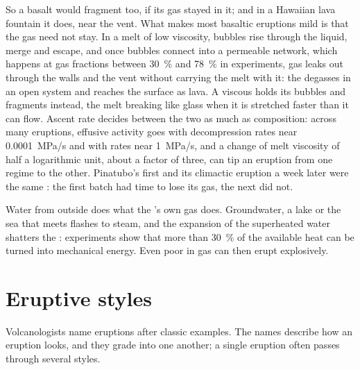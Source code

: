 So a basalt would fragment too, if its gas stayed in it; and in a Hawaiian lava
fountain it does, near the vent. What makes most basaltic eruptions mild is that
the gas need not stay. In a melt of low viscosity, bubbles rise through the
liquid, merge and escape, and once bubbles connect into a permeable network,
which happens at gas fractions between \qty{30}{\percent} and \qty{78}{\percent}
in experiments, gas leaks out through the walls and the vent without carrying the
melt with it: the  degasses in an open system and reaches the surface as
lava. A viscous  holds its bubbles and fragments instead, the melt breaking
like glass when it is stretched faster than it can flow. Ascent rate decides
between the two as much as composition: across many eruptions, effusive activity
goes with decompression rates near \qty{0.0001}{MPa/s} and 
with rates near \qty{1}{MPa/s}, and a change of melt viscosity of half a
logarithmic unit, about a factor of three, can tip an eruption from one regime to
the other. Pinatubo's first  and its climactic eruption a week later
were the same : the first batch had time to lose its gas, the next did not.

Water from outside does what the 's own gas does. Groundwater, a lake or the
sea that meets  flashes to steam, and the expansion of the superheated
water shatters the : experiments show that more than \qty{30}{\percent} of
the available heat can be turned into mechanical energy. Even  poor in gas
can then erupt explosively.

\section{Eruptive styles}

Volcanologists name eruptions after classic examples. The names describe how an
eruption looks, and they grade into one another; a single eruption often passes
through several styles.

